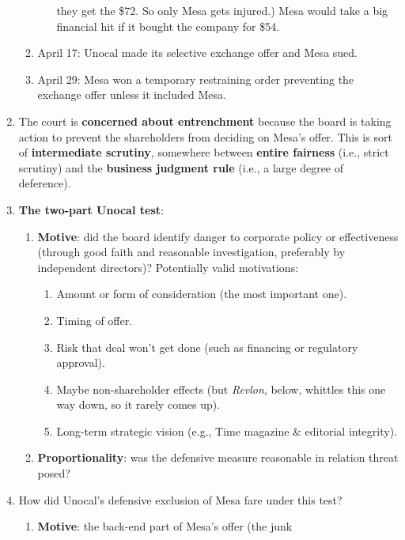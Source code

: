 \begin{enumerate}
\begin{enumerate}
\begin{enumerate}
            they get the \$72. So only Mesa gets injured.) Mesa would take a big 
            financial hit if it bought the company for \$54.
        \end{enumerate}
        \item April 17: Unocal made its selective exchange offer and Mesa sued.
        \item April 29: Mesa won a temporary restraining order preventing the 
        exchange offer unless it included Mesa.
    \end{enumerate}
    \item The court is \textbf{concerned about entrenchment} because the board 
    is taking action to prevent the shareholders from deciding on Mesa's offer. 
    This is sort of \textbf{intermediate scrutiny}, somewhere between 
    \textbf{entire fairness} (i.e., strict scrutiny) and the \textbf{business 
    judgment rule} (i.e., a large degree of deference).
    \item \textbf{The two-part Unocal test}:
    \begin{enumerate}
        \item \textbf{Motive}: did the board identify danger to corporate policy 
        or effectiveness (through good faith and reasonable investigation, 
        preferably by independent directors)? Potentially valid motivations:
        \begin{enumerate}
            \item Amount or form of consideration (the most important one).
            \item Timing of offer.
            \item Risk that deal won't get done (such as financing or regulatory 
            approval).
            \item Maybe non-shareholder effects (but \emph{Revlon}, below, 
            whittles this one way down, so it rarely comes up).
            \item Long-term strategic vision (e.g., Time magazine \& editorial 
            integrity).
        \end{enumerate}
        \item \textbf{Proportionality}: was the defensive measure reasonable in 
        relation threat posed?
    \end{enumerate}
    \item How did Unocal's defensive exclusion of Mesa fare under this test?
    \begin{enumerate}
        \item \textbf{Motive}: the back-end part of Mesa's offer (the junk 

\end{enumerate}
\end{enumerate}
